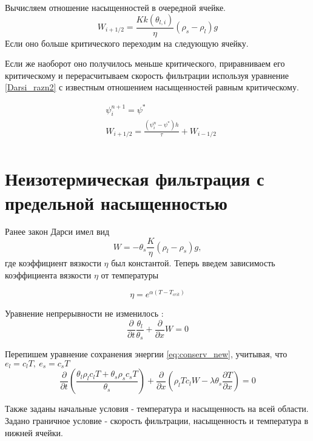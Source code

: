 \documentclass[12pt,a4paper]{article}
\newcommand{\pd}[2]{\frac{\partial #1}{\partial #2}}
\begin{document}
Вычисляем отношение насыщенностей в очередной ячейке. 
\begin{equation}
W_{i+1/2} = \frac{K k(\theta_{l,i})}{\eta}(\rho_s-\rho_l)g
\label{Darsi_razn2}
\end{equation}
Если оно больше критического переходим на следующую ячейку.

Если же наоборот оно получилось меньше критического, приравниваем его критическому и перерасчитываем скорость фильтрации используя уравнение \eqref{Darsi_razn2} с известным отношением насыщенностей равным критическому.

\begin{equation}
\begin{aligned}
&\psi_{i}^{n+1} = \psi^* \\
&W_{i+1/2} = \frac{(\psi_i^n - \psi^*)h}{\tau} + W_{i-1/2} \\
\end{aligned}
\label{corr_razn}
\end{equation}

\newpage
\section{Неизотермическая фильтрация с предельной насыщенностью}

Ранее закон Дарси имел вид 
$$
W= -\theta_s \frac{K}{\eta}(\rho_l-\rho_s)g,
$$
где коэффициент вязкости $\eta $ был константой. Теперь введем зависимость коэффициента вязкости 	$ \eta $ от температуры

\begin{equation}
\eta = e^{\alpha(T - T_{crit})}
\label{viscos}
\end{equation}

Уравнение непрерывности не изменилось :
$$
\pd{}{t}\frac{\theta_l}{\theta_s} + \pd{}{x}W = 0
$$

Перепишем уравнение сохранения энергии \eqref{eq:conserv_new}, учитывая, что $ e_l = c_lT,\ e_s = c_sT $ 
\begin{equation}
\pd{}{t} \left(\frac{\theta_l \rho_l c_l T + \theta_s \rho_s c_s T}{\theta_s}\right) + \pd{}{x}\left(\rho_l T c_l W - \lambda \theta_s \pd{T}{x}\right) = 0
\label{conserv}
\end{equation}

Также заданы начальные условия -  температура и насыщенность на всей области. Задано граничное условие - скорость фильтрации, насыщенность и температура в нижней ячейки.
\end{document}
